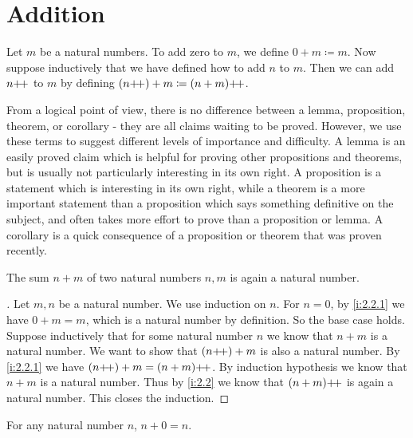 \section{Addition}\label{i:sec:2.2}

\begin{defn}\label{i:2.2.1}
  Let \(m\) be a natural numbers.
  To add zero to \(m\), we define \(0 + m \coloneqq m\).
  Now suppose inductively that we have defined how to add \(n\) to \(m\).
  Then we can add \(n{+}\!{+}\) to \(m\) by defining \((n{+}\!{+}) + m \coloneqq (n + m){+}\!{+}\).
\end{defn}

\begin{note}
  From a logical point of view, there is no difference between a lemma, proposition, theorem, or corollary
  - they are all claims waiting to be proved.
  However, we use these terms to suggest different levels of importance and difficulty.
  A lemma is an easily proved claim which is helpful for proving other propositions and theorems, but is usually not particularly interesting in its own right.
  A proposition is a statement which is interesting in its own right, while a theorem is a more important statement than a proposition which says something definitive on the subject, and often takes more effort to prove than a proposition or lemma.
  A corollary is a quick consequence of a proposition or theorem that was proven recently.
\end{note}

\begin{ac}\label{i:ac:2.2.1}
  The sum \(n + m\) of two natural numbers \(n, m\) is again a natural number.
\end{ac}

\begin{proof}[]
  Let \(m, n\) be a natural number.
  We use induction on \(n\).
  For \(n = 0\), by \cref{i:2.2.1} we have \(0 + m = m\), which is a natural number by definition.
  So the base case holds.
  Suppose inductively that for some natural number \(n\) we know that \(n + m\) is a natural number.
  We want to show that \((n{+}\!{+}) + m\) is also a natural number.
  By \cref{i:2.2.1} we have \((n{+}\!{+}) + m = (n + m){+}\!{+}\).
  By induction hypothesis we know that \(n + m\) is a natural number.
  Thus by \cref{i:2.2} we know that \((n + m){+}\!{+}\) is again a natural number.
  This closes the induction.
\end{proof}

\begin{lem}\label{i:2.2.2}
  For any natural number \(n\), \(n + 0 = n\).
\end{lem}

